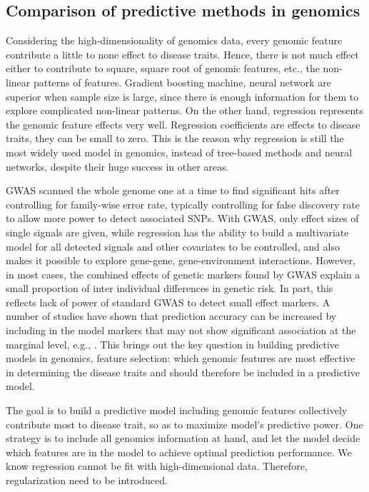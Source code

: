 \subsection{Comparison of predictive methods in genomics}
Considering the high-dimensionality of genomics data, every genomic feature contribute a little to none effect to disease traits. Hence, there is not much effect either to contribute to square, square root of genomic features, etc., the non-linear patterns of features. Gradient boosting machine, neural network are superior when sample size is large, since there is enough information for them to explore complicated non-linear patterns. On the other hand, regression represents the genomic feature effects very well. Regression coefficients are effects to disease traits, they can be small to zero. This is the reason why regression is still the most widely used model in genomics, instead of tree-based methods and neural networks, despite their huge success in other areas.

GWAS scanned the whole genome one at a time to find significant hits after controlling for family-wise error rate, typically controlling for false discovery rate to allow more power to detect associated SNPs. With GWAS, only effect sizes of single signals are given, while regression has the ability to build a multivariate model for all detected signals and other covariates to be controlled, and also makes it possible to explore gene-gene, gene-environment interactions. However, in most cases, the combined effects of genetic markers found by GWAS explain a small proportion of inter individual differences in genetic risk. In part, this reflects lack of power of standard GWAS to detect small effect markers. A number of studies have shown that prediction accuracy can be increased by including in the model markers that may not show significant association at the marginal level, e.g., \citep{allen2010hundreds}. This brings out the key question in building predictive models in genomics, feature selection: which genomic features are most effective in determining the disease traits and should therefore be included in a predictive model.

The goal is to build a predictive model including genomic features collectively contribute most to disease trait, so as to maximize model's predictive power. One strategy is to include all genomics information at hand, and let the model decide which features are in the model to achieve optimal prediction performance. We know regression cannot be fit with high-dimensional data. Therefore, regularization need to be introduced. 


